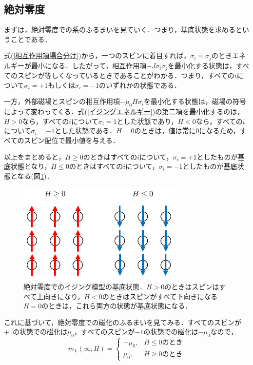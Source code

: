 \documentclass[a4paper,11pt]{jsreport}
\begin{document}
\subsection{絶対零度}
まずは，絶対零度での系のふるまいを見ていく．つまり，基底状態を求めるということである．\par
式(\ref{相互作用項場合分け})から，一つのスピンに着目すれば，$\sigma_i = \sigma_j$のときエネルギーが最小になる．したがって，相互作用項$-J\sigma_i \sigma_j$を最小化する状態は，すべてのスピンが等しくなっているときであることがわかる．つまり，すべての$i$について$\sigma_i = +1$もしくは$\sigma_i = -1$のいずれかの状態である．\par
一方，外部磁場とスピンの相互作用項$-\mu_0 H \sigma_i$を最小化する状態は，磁場の符号によって変わってくる．式(\ref{イジングエネルギー})の第二項を最小化するのは，$H>0$なら，すべての$i$について$\sigma_i=1$とした状態であり，$H<0$なら，すべての$i$について$\sigma_i=-1$とした状態である．$H=0$のときは，値は常に$0$になるため，すべてのスピン配位で最小値を与える．\par
以上をまとめると，$H \geq 0$のときはすべての$i$について，$\sigma_i=+1$としたものが基底状態となり，$H \leq 0$のときはすべての$i$について，$\sigma_i=-1$としたものが基底状態となる(図\ref{絶対零度スピン配位})．\par
\begin{figure}[h]
  \begin{center}
    \includegraphics[height=5cm]{image/絶対零度スピン配位.png}
    \caption{絶対零度でのイジング模型の基底状態．$H>0$のときはスピンはすべて上向きになり，$H<0$のときはスピンがすべて下向きになる$H=0$のときは，これら両方の状態が基底状態になる． \label{絶対零度スピン配位}}
  \end{center}
\end{figure}
これに基づいて，絶対零度での磁化のふるまいを見てみる．すべてのスピンが$+1$の状態での磁化は$\mu_0$，すべてのスピンが$-1$の状態での磁化は$-\mu_0$なので，
\begin{equation}
  m_L(\infty, H) =
  \begin{cases}
    -\mu_0, & H \leq 0 \text{のとき} \\
    \mu_0,  & H \geq 0 \text{のとき}
  \end{cases}
\end{equation}
\end{document}
